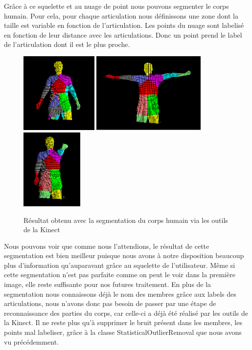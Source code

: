 Grâce à ce squelette et au nuage de point nous pouvons segmenter le corps humain. Pour cela, pour chaque articulation nous définissons une zone
dont la taille est variable en fonction de l'articulation. Les points du nuage sont labelisé en fonction de leur distance avec les articulations.
Donc un point prend le label de l'articulation dont il est le plus proche.

\begin{figure}[!ht]
  \begin{center}
    \includegraphics[height=4cm]{image/lab1.PNG} 
    \includegraphics[height=4cm]{image/lab2.PNG}
    \includegraphics[height=4cm]{image/lab3.PNG}
    \caption{Résultat obtenu avec la segmentation du corps humain via les outils de la Kinect}
  \end{center}
\end{figure}

Nous pouvons voir que comme nous l'attendions, le résultat de cette segmentation est bien meilleur puisque nous avons à notre disposition
beaucoup plus d'information qu'auparavant grâce au squelette de l'utilisateur. Même si cette segmentation n'est pas parfaite comme on peut
le voir dans la première image, elle reste suffisante pour nos futures traitement. En plus de la segmentation nous connaissons déjà le nom
des membres grâce aux labels des articulations, nous n'avons donc pas besoin de passer par une étape de reconnaissance des parties du
corps, car celle-ci a déjà été réalisé par les outils de la Kinect. Il ne reste plus qu'à supprimer le bruit présent dans les membres, les points
mal labeliser, grâce à la classe StatisticalOutlierRemoval que nous avons vu précédemment.

